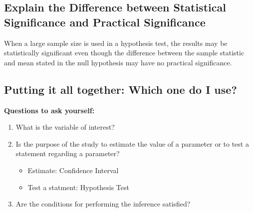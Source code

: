 \documentclass{report}
\begin{document}
    \bigbreak \noindent 

    \bigbreak \noindent \bigbreak \noindent 
    \subsection*{Explain the Difference between Statistical Significance and Practical Significance}
    \bigbreak \noindent     When a large sample size is used in a hypothesis test, the results may be statistically significant even though the difference between the sample statistic and mean stated in the null hypothesis may have no practical significance.

    \bigbreak \noindent \bigbreak \noindent 
    \subsection*{Putting it all together: Which one do I use?}
    \bigbreak \noindent 
        \bigbreak \noindent 
    \textbf{Questions to ask yourself:}
    \bigbreak \noindent 
    \begin{enumerate}
        \item What is the variable of interest? 
        \item Is the purpose of the study to estimate the value of a parameter or to test a statement regarding a parameter?
            \begin{itemize}
                \item Estimate: Confidence Interval
                \item Test a statment: Hypothesis Test
            \end{itemize}
        \item Are the conditions for performing the inference satisfied? 
    \end{enumerate}


    \bigbreak \noindent \bigbreak \noindent 
\end{document}
